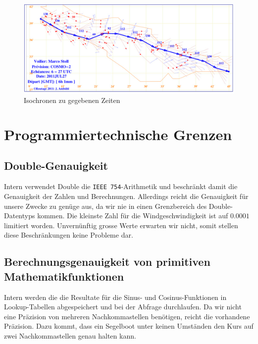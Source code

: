 \begin{figure}[h!]
\centering
\includegraphics[width=1\linewidth]{img/isochronen}
\caption{Isochronen zu gegebenen Zeiten}
\label{isochron}
\end{figure}

\clearpage

\section{Programmiertechnische Grenzen}
\subsection{Double-Genauigkeit}
Intern verwendet Double die \texttt{IEEE 754}-Arithmetik und beschränkt damit
die Genauigkeit der Zahlen und Berechnungen. Allerdings reicht die Genauigkeit
für unsere Zwecke zu genüge aus, da wir nie in einen Grenzbereich des
Double-Datentyps kommen. Die kleinste Zahl für die Windgeschwindigkeit ist auf
$0.0001$ limitiert worden. Unvernünftig grosse Werte erwarten wir nicht, somit
stellen diese Beschränkungen keine Probleme dar.

\subsection{Berechnungsgenauigkeit von primitiven Mathematikfunktionen}
Intern werden die die Resultate für die Sinus- und Cosinus-Funktionen in
Lookup-Tabellen abgespeichert und bei der Abfrage durchlaufen. Da wir nicht
eine Präzision von mehreren Nachkommastellen benötigen, reicht die vorhandene
Präzision. Dazu kommt, dass ein Segelboot unter keinen Umständen den Kurs auf
zwei Nachkommastellen genau halten kann.

